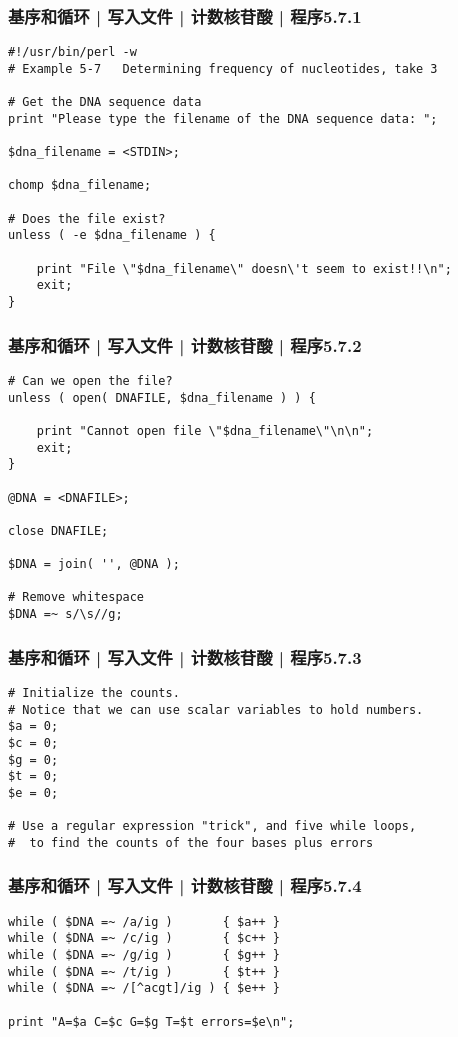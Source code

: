 \begin{frame}[fragile]
  \frametitle{基序和循环 | 写入文件 | 计数核苷酸 | 程序5.7.1}
\begin{lstlisting}[firstnumber=1,basicstyle=\footnotesize\tt,numberstyle=\scriptsize]
#!/usr/bin/perl -w
# Example 5-7   Determining frequency of nucleotides, take 3

# Get the DNA sequence data
print "Please type the filename of the DNA sequence data: ";

$dna_filename = <STDIN>;

chomp $dna_filename;

# Does the file exist?
unless ( -e $dna_filename ) {

    print "File \"$dna_filename\" doesn\'t seem to exist!!\n";
    exit;
}
\end{lstlisting}
\end{frame}

\begin{frame}[fragile]
  \frametitle{基序和循环 | 写入文件 | 计数核苷酸 | 程序5.7.2}
\begin{lstlisting}[firstnumber=18,basicstyle=\small\tt]
# Can we open the file?
unless ( open( DNAFILE, $dna_filename ) ) {

    print "Cannot open file \"$dna_filename\"\n\n";
    exit;
}

@DNA = <DNAFILE>;

close DNAFILE;

$DNA = join( '', @DNA );

# Remove whitespace
$DNA =~ s/\s//g;
\end{lstlisting}
\end{frame}

\begin{frame}[fragile]
  \frametitle{基序和循环 | 写入文件 | 计数核苷酸 | 程序5.7.3}
\begin{lstlisting}[firstnumber=34]
# Initialize the counts.
# Notice that we can use scalar variables to hold numbers.
$a = 0;
$c = 0;
$g = 0;
$t = 0;
$e = 0;

# Use a regular expression "trick", and five while loops,
#  to find the counts of the four bases plus errors
\end{lstlisting}
\end{frame}

\begin{frame}[fragile]
  \frametitle{基序和循环 | 写入文件 | 计数核苷酸 | 程序5.7.4}
\begin{lstlisting}[firstnumber=44]
while ( $DNA =~ /a/ig )       { $a++ }
while ( $DNA =~ /c/ig )       { $c++ }
while ( $DNA =~ /g/ig )       { $g++ }
while ( $DNA =~ /t/ig )       { $t++ }
while ( $DNA =~ /[^acgt]/ig ) { $e++ }

print "A=$a C=$c G=$g T=$t errors=$e\n";
\end{lstlisting}
\end{frame}

